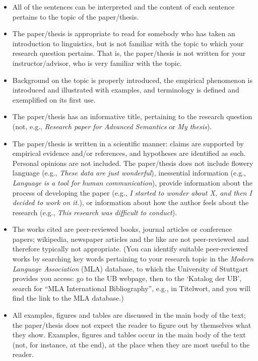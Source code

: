 \documentclass[11pt,fleqn,a4paper/thesis]{article}
\newcommand{\6}{\mbox{$[\hspace*{-.6mm}[$}}
\newcommand{\9}{\mbox{$]\hspace*{-.6mm}]$}}
\begin{document}
\begin{itemize}[itemsep=-1pt,leftmargin=2.5ex,topsep=-2pt]

\item All of the sentences can be interpreted and the content of each sentence pertains to the topic of the paper/thesis.

\item The paper/thesis is appropriate to read for somebody who has taken an introduction to linguistics, but is not familiar with the topic to which your research question pertains. That is, the paper/thesis is not written for your instructor/advisor, who is very familiar with the topic.

\item Background on the topic is properly introduced, the empirical phenomenon is introduced and illustrated with examples, and terminology is defined and exemplified on its first use. 

\item The paper/thesis has an informative title, pertaining to the research question (not, e.g., {\em Research paper for Advanced Semantics} or {\em My thesis}).

\item The paper/thesis is written in a scientific manner: claims are supported by empirical evidence and/or references, and hypotheses are identified as such. Personal opinions are not included. The paper/thesis does not include flowery language (e.g., {\em These data are just wonderful}), inessential information (e.g., {\em Language is a tool for human communication}), provide information about the process of developing the paper (e.g., {\em I started to wonder about X, and then I decided to work on it.}), or information about how the author feels about the research (e.g., {\em This research was difficult to conduct}).

\item The works cited are peer-reviewed books, journal articles or conference papers; wikipedia, newspaper articles and the like are not peer-reviewed and therefore typically not appropriate. (You can identify suitable peer-reviewed works by searching key words pertaining to your research topic in the {\em Modern Language Association} (MLA) database, to which the University of Stuttgart provides you access: go to the UB webpage, then to the `Katalog  der UB', search for ``MLA International Bibliography'', e.g., in Titelwort, and you will find the link to the MLA database.)

\item All examples, figures and tables are discussed in the main body of the text; the paper/thesis does not expect the reader to figure out by themselves what they show. Examples, figures and tables occur in the main body of the text (not, for instance, at the end), at the place when they are most useful to the reader.


\end{itemize}
\end{document}
